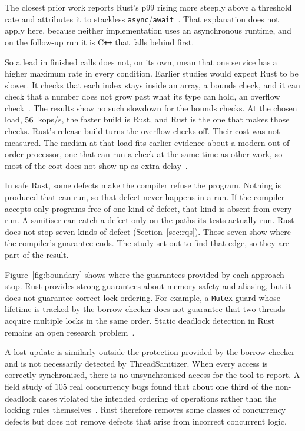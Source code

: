 \documentclass[english,oneside,a4paper,censored,csm,software-track-2020]{HYthesisML}
\begin{document}
The closest prior work reports Rust's p99 rising more steeply above a threshold
rate and attributes it to stackless
\texttt{async}/\texttt{await}~\cite{arvidsson2025async}. That explanation does
not apply here, because neither implementation uses an asynchronous runtime, and
on the follow-up run it is C\texttt{++} that falls behind first.

So a lead in finished calls does not, on its own, mean that one service has a
higher maximum rate in every condition. Earlier studies would expect Rust to be
slower. It checks that each index stays inside an array, a bounds check, and it
can check that a number does not grow past what its type can hold, an overflow
check~\cite{zhang2022runtime,harris2023morello}. The results show no such
slowdown for the bounds checks. At the chosen load, $56$~kops/s, the
faster build is Rust, and Rust is the one that makes those checks. Rust's
release build turns the overflow checks off. Their cost was not measured. The
median at that load fits earlier evidence about a modern out-of-order processor,
one that can run a check at the same time as other work, so most of the cost
does not show up as extra delay~\cite{balasubramanian2017rust,emmerich2019drivers}.

In safe Rust, some defects make the compiler refuse the program. Nothing is
produced that can run, so that defect never happens in a run. If the compiler
accepts only programs free of one kind of defect, that kind is absent from every
run. A sanitiser can catch a defect only on the paths its tests actually run.
Rust does not stop seven kinds of defect (Section~\ref{sec:rqs}). Those seven
show where the compiler's guarantee ends. The study set out to find that edge,
so they are part of the result.

Figure~\ref{fig:boundary} shows where the guarantees provided by each
approach stop. Rust provides strong guarantees about memory safety and
aliasing, but it does not guarantee correct lock ordering. For example, a
\texttt{Mutex} guard whose lifetime is tracked by the borrow checker does not
guarantee that two threads acquire multiple locks in the same order. Static
deadlock detection in Rust remains an open research
problem~\cite{zhang2026deadlock}.

A lost update is similarly outside the protection provided by the borrow
checker and is not necessarily detected by ThreadSanitizer. When every access
is correctly synchronised, there is no unsynchronised access for the tool to
report. A field study of $105$ real concurrency bugs found that about one third
of the non-deadlock cases violated the intended ordering of operations rather
than the locking rules themselves~\cite{lu2008mistakes}. Rust therefore removes
some classes of concurrency defects but does not remove defects that arise from
incorrect concurrent logic.
\end{document}
